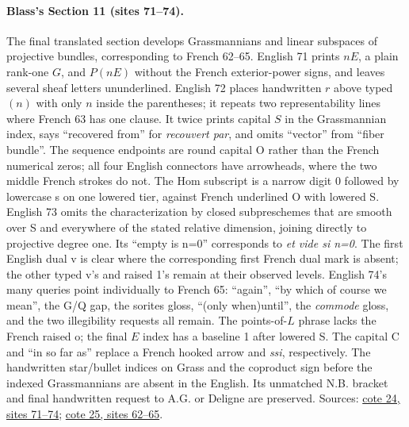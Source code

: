 \paragraph{Blass's Section 11 (sites 71--74).}
The final translated section develops Grassmannians and linear subspaces of projective bundles, corresponding to French 62--65. English 71 prints $nE$, a plain rank-one $G$, and $P(nE)$ without the French exterior-power signs, and leaves several sheaf letters ununderlined. English 72 places handwritten $r$ above typed $(n)$ with only $n$ inside the parentheses; it repeats two representability lines where French 63 has one clause. It twice prints capital $S$ in the Grassmannian index, says ``recovered from'' for \emph{recouvert par}, and omits ``vector'' from ``fiber bundle''. The sequence endpoints are round capital O rather than the French numerical zeros; all four English connectors have arrowheads, where the two middle French strokes do not. The Hom subscript is a narrow digit 0 followed by lowercase s on one lowered tier, against French underlined O with lowered S. English 73 omits the characterization by closed subpreschemes that are smooth over S and everywhere of the stated relative dimension, joining directly to projective degree one. Its ``empty is n=0'' corresponds to \emph{et vide si n=0}. The first English dual v is clear where the corresponding first French dual mark is absent; the other typed v's and raised 1's remain at their observed levels. English 74's many queries point individually to French 65: ``again'', ``by which of course we mean'', the G/Q gap, the sorites gloss, ``(only when)until'', the \emph{commode} gloss, and the two illegibility requests all remain. The points-of-$L$ phrase lacks the French raised o; the final $E$ index has a baseline 1 after lowered S. The capital C and ``in so far as'' replace a French hooked arrow and \emph{ssi}, respectively. The handwritten star/bullet indices on Grass and the coproduct sign before the indexed Grassmannians are absent in the English. Its unmatched N.B. bracket and final handwritten request to A.G. or Deligne are preserved. Sources: \href{https://grothendieck.umontpellier.fr/web/viewer.html?file=../24.pdf\#page=72}{cote 24, sites 71--74}; \href{https://grothendieck.umontpellier.fr/web/viewer.html?file=../25.pdf\#page=63}{cote 25, sites 62--65}.

